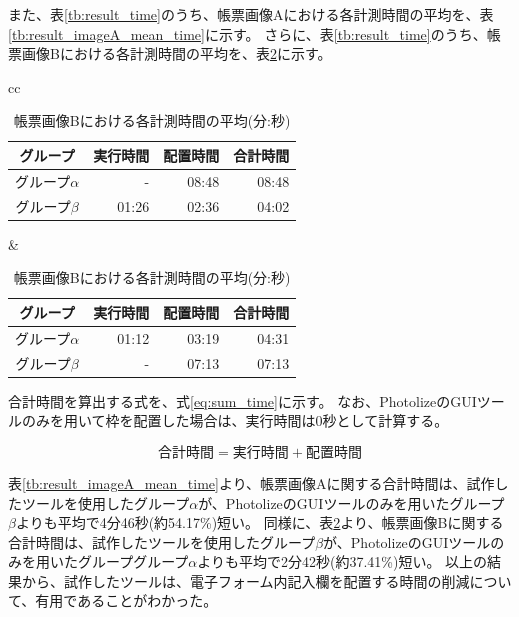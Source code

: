 また、表\ref{tb:result_time}のうち、帳票画像Aにおける各計測時間の平均を、表\ref{tb:result_imageA_mean_time}に示す。
さらに、表\ref{tb:result_time}のうち、帳票画像Bにおける各計測時間の平均を、表\ref{tb:result_imageB_mean_time}に示す。

\begin{table}[tp]
	\centering
    \begin{tabular}{cc}
        \begin{minipage}[c]{0.5\hsize}
            \centering
            \caption{帳票画像Aにおける各計測時間の平均(分:秒)}
            \label{tb:result_imageA_mean_time}
            \begin{tabular}{c|rrr}
                グループ & 実行時間 & 配置時間 & 合計時間 \\
                \hline \hline
                グループ$\alpha$ & - & 08:48 & 08:48 \\
                グループ$\beta$ & 01:26 & 02:36 & 04:02 \\
	        \end{tabular}
        \end{minipage} &
        \begin{minipage}[c]{0.5\hsize}
            \centering
            \caption{帳票画像Bにおける各計測時間の平均(分:秒)}
            \label{tb:result_imageB_mean_time}
            \begin{tabular}{c|rrr}
                グループ & 実行時間 & 配置時間 & 合計時間 \\
                \hline \hline
                グループ$\alpha$ & 01:12 & 03:19 & 04:31 \\
                グループ$\beta$ & - & 07:13 & 07:13 \\
            \end{tabular}
        \end{minipage}
    \end{tabular}
\end{table}

合計時間を算出する式を、式\ref{eq:sum_time}に示す。
なお、PhotolizeのGUIツールのみを用いて枠を配置した場合は、実行時間は0秒として計算する。

\begin{equation}\label{eq:sum_time}
    合計時間=実行時間+配置時間
\end{equation}

表\ref{tb:result_imageA_mean_time}より、帳票画像Aに関する合計時間は、試作したツールを使用したグループ$\alpha$が、PhotolizeのGUIツールのみを用いたグループ$\beta$よりも平均で4分46秒(約54.17\%)短い。
同様に、表\ref{tb:result_imageB_mean_time}より、帳票画像Bに関する合計時間は、試作したツールを使用したグループ$\beta$が、PhotolizeのGUIツールのみを用いたグループグループ$\alpha$よりも平均で2分42秒(約37.41\%)短い。
以上の結果から、試作したツールは、電子フォーム内記入欄を配置する時間の削減について、有用であることがわかった。

